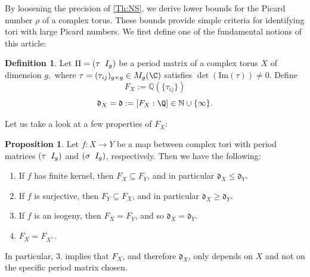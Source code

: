 \documentclass[11pt,leqno]{article}
\theoremstyle{definition}
\newtheorem{definition}{\bf Definition}[section]
\newtheorem{proposition}{Proposition}[section]
\begin{document}
By loosening the precision of \cref{Th:NS}, we derive lower bounds for the Picard number $\rho$ of a complex torus. These bounds provide simple criteria for identifying tori with large Picard numbers. We first define one of the fundamental notions of this article:

\begin{definition}
Let $\Pi=(\tau\hspace{0.2cm}I_g)$ be a period matrix of a complex torus $X$ of dimension $g,$ where $\tau=(\tau_{ij})_{g\times g}\in M_g(\C)$ satisfies $\det(\mathrm{Im}(\tau))\neq0.$ Define
$$F_X:=\mathbb{Q}(\{\tau_{ij}\})$$
   $$\mathfrak{d}_X=\mathfrak{d}:=[F_X:\Q]\in\mathbb{N}\cup\{\infty\}.$$ 
\end{definition}

Let us take a look at a few properties of $F_X$:

\begin{proposition}
\label{prop:2302}
Let $f:X\to Y$ be a map between complex tori with period matrices $(\tau\hspace{0.2cm}I_g)$ and $(\sigma\hspace{0.2cm}I_g)$, respectively. Then we have the following: 
\begin{enumerate}
\item If $f$ has finite kernel, then $F_X\subseteq F_Y$, and in particular $\mathfrak{d}_X\leq\mathfrak{d}_Y$.
\item If $f$ is surjective, then $F_Y\subseteq F_X$, and in particular $\mathfrak{d}_X\geq\mathfrak{d}_Y$.
\item If $f$ is an isogeny, then $F_X=F_Y$, and so $\mathfrak{d}_X=\mathfrak{d}_Y$.
\item $F_X=F_{X^\vee}$.
\end{enumerate}
In particular, 3. implies that $F_X$, and therefore $\mathfrak{d}_X$, only depends on $X$ and not on the specific period matrix chosen.
\end{proposition}
\end{document}
